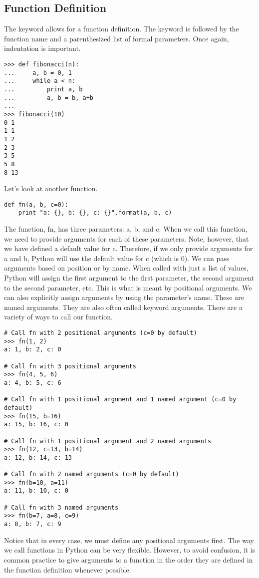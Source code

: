 \subsection*{Function Definition}
\begin{example}

The  keyword allows for a function definition. The keyword is followed by 
the function name and a parenthesized list of formal parameters.
Once again, indentation is important. 
\begin{lstlisting}
>>> def fibonacci(n):
...     a, b = 0, 1
...     while a < n:
...         print a, b
...         a, b = b, a+b
...         
>>> fibonacci(10)
0 1
1 1
1 2
2 3
3 5
5 8
8 13
\end{lstlisting}

Let's look at another function.
\begin{lstlisting}
def fn(a, b, c=0):
    print "a: {}, b: {}, c: {}".format(a, b, c)
\end{lstlisting}
The function, fn, has three parameters: a, b, and c.
When we call this function, we need to provide arguments for each of these parameters.
Note, however, that we have defined a default value for c.
Therefore, if we only provide arguments for a and b, Python will use the default value for c (which is 0).
We can pass arguments based on position or by name.
When called with just a list of values, Python will assign the first argument to the first parameter,
the second argument to the second parameter, etc.
This is what is meant by positional arguments.
We can also explicitly assign arguments by using the parameter's name.
These are named arguments.
They are also often called keyword arguments.
There are a variety of ways to call our function.
\begin{lstlisting}
# Call fn with 2 positional arguments (c=0 by default)
>>> fn(1, 2)
a: 1, b: 2, c: 0

# Call fn with 3 positional arguments
>>> fn(4, 5, 6)
a: 4, b: 5, c: 6

# Call fn with 1 positional argument and 1 named argument (c=0 by default)
>>> fn(15, b=16)
a: 15, b: 16, c: 0

# Call fn with 1 positional argument and 2 named arguments
>>> fn(12, c=13, b=14)
a: 12, b: 14, c: 13

# Call fn with 2 named arguments (c=0 by default)
>>> fn(b=10, a=11)
a: 11, b: 10, c: 0

# Call fn with 3 named arguments
>>> fn(b=7, a=8, c=9)
a: 8, b: 7, c: 9
\end{lstlisting}
Notice that in every case, we must define any positional arguments first.
The way we call functions in Python can be very flexible.
However, to avoid confusion, it is common practice to give arguments to a function in the order they are defined in the function definition whenever possible.


\end{example}

